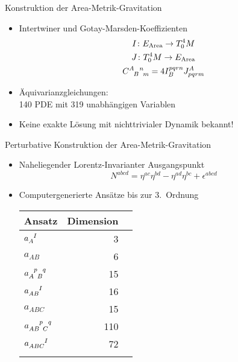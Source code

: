 \documentclass{beamer}
\newcommand{\gmc}[4]{\ensuremath{C^{#1\hphantom{#2}#3}_{\hphantom{#1}{#2}\hphantom{#3}#4}}}
\begin{document}
    \begin{frame}{Konstruktion der Area-Metrik-Gravitation}
        \begin{itemize}
            \item Intertwiner und Gotay-Marsden-Koeffizienten
            \begin{gather*}
                I \colon E_\text{Area} \rightarrow T^4_0 M \\
                J  \colon T^4_0 M \rightarrow E_\text{Area} \\
                \gmc{A}{B}{n}{m} = 4 I^{pqrn}_B J_{pqrm}^A
            \end{gather*}
            \item Äquivarianzgleichungen: \\
            140 PDE mit 319 unabhängigen Variablen
            \item Keine exakte Lösung mit nichttrivialer Dynamik bekannt!
        \end{itemize}
    \end{frame}

    \begin{frame}{Perturbative Konstruktion der Area-Metrik-Gravitation}
        \begin{itemize}
            \item Naheliegender Lorentz-Invarianter Ausgangspunkt
            \[
                N^{abcd} = \eta^{ac} \eta^{bd} - \eta^{ad} \eta^{bc} + \epsilon^{abcd}
            \]
            \item Computergenerierte Ansätze bis zur 3.\ Ordnung
            \footnotesize
            \begin{table}
                \centering
                \begin{tabular}{l r r}
                    \toprule
                    Ansatz                                            & Dimension \\
                    \midrule
                    $a_A^{\hphantom AI}$                              & 3         \\ \addlinespace[2pt]
                    $a_{AB}$                                          & 6         \\ \addlinespace[2pt]
                    $a_{A\hphantom pB}^{\hphantom Ap\hphantom Bq}$    & 15        \\ \addlinespace[2pt]
                    $a_{AB}^{\hphantom{AB}I}$                         & 16        \\ \addlinespace[2pt]
                    $a_{ABC}$                                         & 15        \\ \addlinespace[2pt]
                    $a_{AB\hphantom pC}^{\hphantom{AB}p\hphantom Cq}$ & 110       \\ \addlinespace[2pt]
                    $a_{ABC}^{\hphantom{ABC}I}$                       & 72        \\ \addlinespace[2pt]
                    \bottomrule
                \end{tabular}\label{tab:ansaetze}
            \end{table}
        \end{itemize}
    \end{frame}
\end{document}

